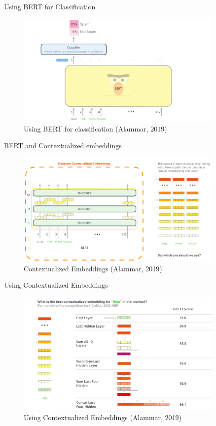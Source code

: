 \documentclass[10pt]{beamer}
\begin{document}
\begin{frame}{Using BERT for Classification}

\begin{figure}[h]
\centering
\includegraphics[width=0.9\textwidth]{fig/bert-classifier.png}
\caption{Using BERT for classification (Alammar, 2019)}
\end{figure}

\end{frame}

\begin{frame}{BERT and Contextualized embeddings}

\begin{figure}[h]
\centering
\includegraphics[width=0.9\textwidth]{fig/bert-contexualized-embeddings.png}
\caption{Contextualized Embeddings (Alammar, 2019)}
\end{figure}

\end{frame}

\begin{frame}{Using Contextualized Embeddings}

\begin{figure}[h]
\centering
\includegraphics[width=0.9\textwidth]{fig/bert-feature-extraction-contextualized-embeddings.png}
\caption{Using Contextualized Embeddings (Alammar, 2019)}
\end{figure}

\end{frame}
\end{document}
